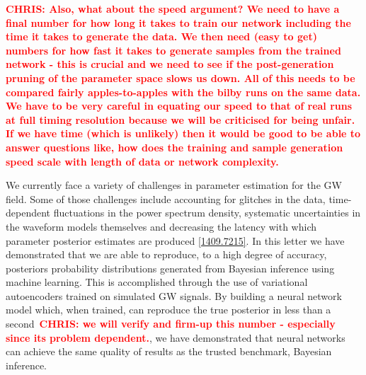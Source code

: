 \documentclass[%
showpacs,
 amsmath,amssymb,
 aps,
 twocolumn,
 prl,
 reprint,
floatfix,
]{revtex4-1}
\newcommand{\chris}[1]{\textbf{\textcolor{red}{CHRIS: #1}}}
\begin{document}

\chris{Also, what about the speed argument? We need to have a final number for
how long it takes to train our network including the time it takes to generate
the data. We then need (easy to get) numbers for how fast it takes to generate
samples from the trained network - this is crucial and we need to see if the
post-generation pruning of the parameter space slows us down. All of this needs
to be compared fairly apples-to-apples with the bilby runs on the same data. We
have to be very careful in equating our speed to that of real runs at full
timing resolution because we will be criticised for being unfair. If we have
time (which is unlikely) then it would be good to be able to answer questions
like, how does the training and sample generation speed scale with length of
data or network complexity.}

%
%
We currently face a variety of challenges in 
parameter estimation for the \ac{GW} field. Some of those 
challenges include accounting for glitches in the data, time-dependent 
fluctuations in the power spectrum density, systematic uncertainties 
in the waveform models themselves and decreasing the latency with 
which parameter posterior estimates are produced \ref{1409.7215}. 
In this letter we have demonstrated that we are able to
reproduce, to a high degree of accuracy, posteriors probability distributions generated from Bayesian
inference using machine learning. This is accomplished through the use of
variational autoencoders trained on simulated \ac{GW} signals. By building a neural network model which,
when trained, can reproduce the true posterior in less than a second~\chris{we
will verify and firm-up this number - especially since its problem dependent.},
we have demonstrated that neural networks can achieve the same 
quality of results as the trusted
benchmark, Bayesian inference.
\end{document}
